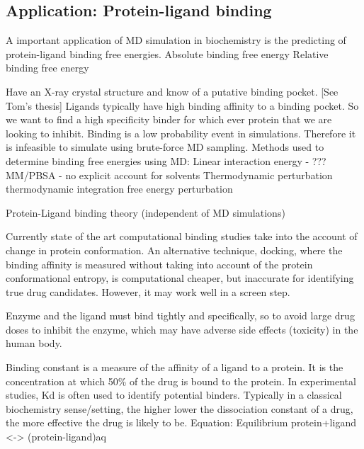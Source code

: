 \subsection{Application: Protein-ligand binding}
\1 A important application of MD simulation in biochemistry is the predicting of protein-ligand binding free energies.
  \2 
  \2 Absolute binding free energy
  \2 Relative binding free energy

\1 Have an X-ray crystal structure and know of a putative binding pocket. [See Tom's thesis]
\1 Ligands typically have high binding affinity to a binding pocket. So we want to find a high specificity binder for which ever protein that we are looking to inhibit.
  \2 Binding is a low probability event in simulations. Therefore it is infeasible to simulate using brute-force MD sampling.
  \2 Methods used to determine binding free energies using MD: 
  \3 Linear interaction energy - ???
  \3 MM/PBSA - no explicit account for solvents
  \3 Thermodynamic perturbation 
       \4 thermodynamic integration
       \4 free energy perturbation

\1 Protein-Ligand binding theory (independent of MD simulations)

  \2 Currently state of the art computational binding studies take into the account of change in protein conformation.  An alternative technique, docking, where the binding affinity is measured without taking into account of the protein conformational entropy, is computational cheaper, but inaccurate for identifying true drug candidates.  However, it may work well in a screen step.

  \2 Enzyme and the ligand must bind tightly and specifically, so to avoid large drug doses to inhibit the enzyme, which may have adverse side effects (toxicity) in the human body.

  \2 Binding constant is a measure of the affinity of a ligand to a protein. It is the concentration at which 50\% of the drug is bound to the protein. In experimental studies, Kd is often used to identify potential binders. Typically in a classical biochemistry sense/setting, the higher lower the dissociation constant of a drug, the more effective the drug is likely to be.
    \3 Equation: Equilibrium protein+ligand <-> (protein-ligand)aq

